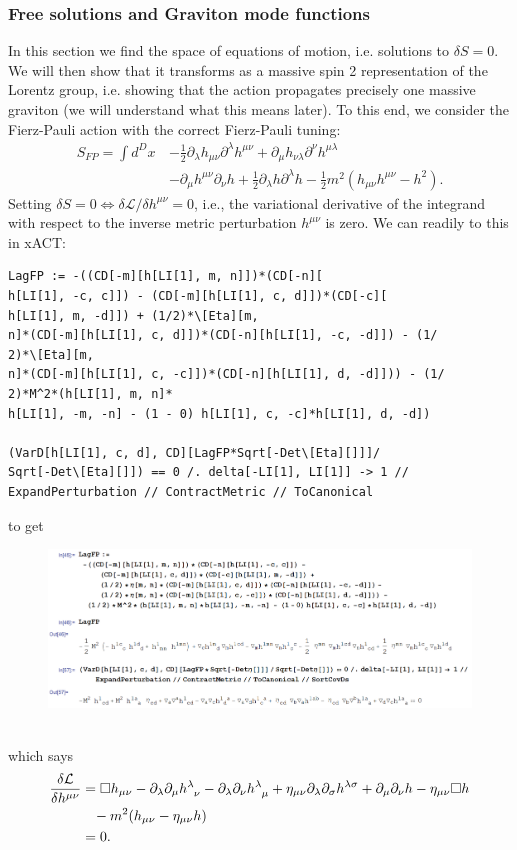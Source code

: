 \documentclass{book}
\theoremstyle{definition}
\newcommand{\p}{\partial}
\newcommand{\lag}{\mathcal{L}}
\newcommand{\nn}{\nonumber}
\newcommand{\f}[2]{\frac{#1}{#2}}
\newcommand{\lp}{\left(}
\newcommand{\rp}{\right)}
\begin{document}
\subsubsection{Free solutions and Graviton mode functions}

In this section we find the space of equations of motion, i.e. solutions to $\delta S = 0$. We will then show that it transforms as a massive spin 2 representation of the Lorentz group, i.e. showing that the action propagates precisely one massive graviton (we will understand what this means later). To this end, we consider the Fierz-Pauli action with the correct Fierz-Pauli tuning:
\begin{align}
S_{FP} = \int d^Dx\, &-\f{1}{2}\p_\lambda h_{\mu\nu} \p^\lambda h^{\mu\nu} + \p_\mu h_{\nu\lambda}\p^\nu h^{\mu\lambda}\nn\\& - \p_\mu h^{\mu\nu}\p_\nu h + \f{1}{2}\p_\lambda h \p^\lambda h -\f{1}{2}m^2\lp h_{\mu\nu}h^{\mu\nu} - h^2 \rp.
\end{align}  
Setting $\delta S = 0 \iff \delta \lag / \delta h^{\mu\nu} = 0$, i.e., the variational derivative of the integrand with respect to the inverse metric perturbation $h^{\mu\nu}$ is zero. We can readily to this in xACT:
\begin{lstlisting}
LagFP := -((CD[-m][h[LI[1], m, n]])*(CD[-n][
h[LI[1], -c, c]]) - (CD[-m][h[LI[1], c, d]])*(CD[-c][
h[LI[1], m, -d]]) + (1/2)*\[Eta][m, 
n]*(CD[-m][h[LI[1], c, d]])*(CD[-n][h[LI[1], -c, -d]]) - (1/
2)*\[Eta][m, 
n]*(CD[-m][h[LI[1], c, -c]])*(CD[-n][h[LI[1], d, -d]])) - (1/
2)*M^2*(h[LI[1], m, n]*
h[LI[1], -m, -n] - (1 - 0) h[LI[1], c, -c]*h[LI[1], d, -d])

(VarD[h[LI[1], c, d], CD][LagFP*Sqrt[-Det\[Eta][]]]/
Sqrt[-Det\[Eta][]]) == 0 /. delta[-LI[1], LI[1]] -> 1 // 
ExpandPerturbation // ContractMetric // ToCanonical
\end{lstlisting}
to get
\begin{figure}[!htb]
	\includegraphics[scale=0.26]{free-soln}
\end{figure}\\
which says
\begin{align}
\f{\delta \lag}{\delta h^{\mu\nu}} &= \square h_{\mu\nu} - \p_\lambda \p_\mu \tensor{h}{^\lambda_\nu} - \p_\lambda \p_\nu \tensor{h}{^\lambda_\mu} + \eta_{\mu\nu}\p_\lambda \p_\sigma h^{\lambda\sigma} + \p_\mu \p_\nu h - \eta_{\mu\nu}\square h  \nn\\
&\,\,\,\,\,- m^2(h_{\mu\nu} - \eta_{\mu\nu}h)\nn\\
&= 0.
\end{align}
\end{document}
